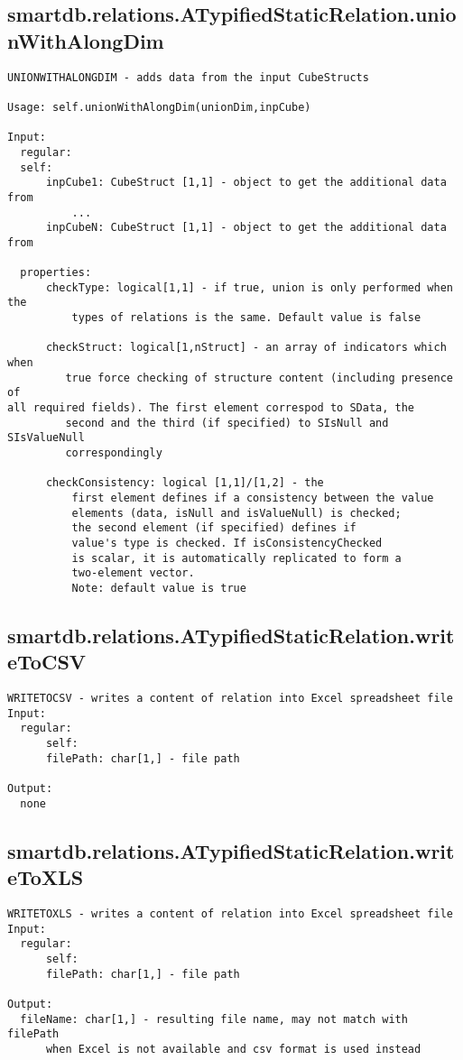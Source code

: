 \subsection{\texorpdfstring{smartdb.relations.ATypifiedStaticRelation.unionWithAlongDim}{unionWithAlongDim}}\label{method:smartdb.relations.ATypifiedStaticRelation.unionWithAlongDim}
\begin{verbatim}
UNIONWITHALONGDIM - adds data from the input CubeStructs

Usage: self.unionWithAlongDim(unionDim,inpCube)

Input:
  regular:
  self:
      inpCube1: CubeStruct [1,1] - object to get the additional data from
          ...
      inpCubeN: CubeStruct [1,1] - object to get the additional data from

  properties:
      checkType: logical[1,1] - if true, union is only performed when the
          types of relations is the same. Default value is false

      checkStruct: logical[1,nStruct] - an array of indicators which when
         true force checking of structure content (including presence of
all required fields). The first element correspod to SData, the
         second and the third (if specified) to SIsNull and SIsValueNull
         correspondingly

      checkConsistency: logical [1,1]/[1,2] - the
          first element defines if a consistency between the value
          elements (data, isNull and isValueNull) is checked;
          the second element (if specified) defines if
          value's type is checked. If isConsistencyChecked
          is scalar, it is automatically replicated to form a
          two-element vector.
          Note: default value is true
\end{verbatim}
\subsection{\texorpdfstring{smartdb.relations.ATypifiedStaticRelation.writeToCSV}{writeToCSV}}\label{method:smartdb.relations.ATypifiedStaticRelation.writeToCSV}
\begin{verbatim}
WRITETOCSV - writes a content of relation into Excel spreadsheet file
Input:
  regular:
      self:
      filePath: char[1,] - file path

Output:
  none
\end{verbatim}
\subsection{\texorpdfstring{smartdb.relations.ATypifiedStaticRelation.writeToXLS}{writeToXLS}}\label{method:smartdb.relations.ATypifiedStaticRelation.writeToXLS}
\begin{verbatim}
WRITETOXLS - writes a content of relation into Excel spreadsheet file
Input:
  regular:
      self:
      filePath: char[1,] - file path

Output:
  fileName: char[1,] - resulting file name, may not match with filePath
      when Excel is not available and csv format is used instead
\end{verbatim}
